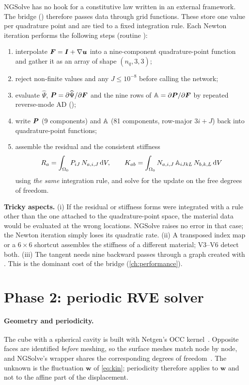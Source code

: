 NGSolve has no hook for a constitutive law written in an external framework.
The bridge () therefore passes data through
 grid functions. These store one value per
quadrature point and are tied to a fixed integration rule. Each Newton
iteration performs the following steps (routine ):
\begin{enumerate}
  \item interpolate $\bm F=\bm I+\nabla\bm u$ into a nine-component quadrature-point
        function and gather it as an array of shape $(n_q,3,3)$;
  \item reject non-finite values and any $J\le10^{-8}$ before calling the network;
  \item evaluate $\widehat\Psi$, $\bm P=\partial\widehat\Psi/\partial\bm F$ and the nine rows of
        $\mathbb A=\partial\bm P/\partial\bm F$ by repeated reverse-mode AD
        ();
  \item write $\bm P$ (9 components) and $\mathbb A$ (81 components, row-major
        $3i+J$) back into quadrature-point functions;
  \item assemble the residual and the consistent stiffness
        \begin{equation}
          R_a=\int_{\Omega_0}P_{iJ}\,N_{a,i,J}\,\mathrm d V,\qquad
          K_{ab}=\int_{\Omega_0}N_{a,i,J}\,\mathbb A_{iJkL}\,N_{b,k,L}\,\mathrm d V
        \end{equation}
        using \emph{the same} integration rule, and solve for the update on the
        free degrees of freedom.
\end{enumerate}
\textbf{Tricky aspects.} (i) If the residual or stiffness forms were integrated
with a rule other than the one attached to the quadrature-point space, the
material data would be evaluated at the wrong locations. NGSolve raises no error
in that case; the Newton iteration simply loses its quadratic rate. (ii) A
transposed index map or a $6\times6$ shortcut assembles the stiffness of a
different material; V3--V6 detect both. (iii) The tangent needs nine
backward passes through a graph created with . This is
the dominant cost of the bridge (\cref{ch:performance}).

\section{Phase 2: periodic RVE solver}

\paragraph{Geometry and periodicity.} The cube with a spherical cavity is built
with Netgen's OCC kernel~\cite{Schoeberl1997}. Opposite faces are identified \emph{before} meshing, so
the surface meshes match node by node, and NGSolve's  wrapper
shares the corresponding degrees of freedom~\cite{NGSolvePeriodic}. The unknown
is the fluctuation $\bm w$ of \cref{eq:kin}; periodicity therefore applies to $\bm w$
and not to the affine part of the displacement.

